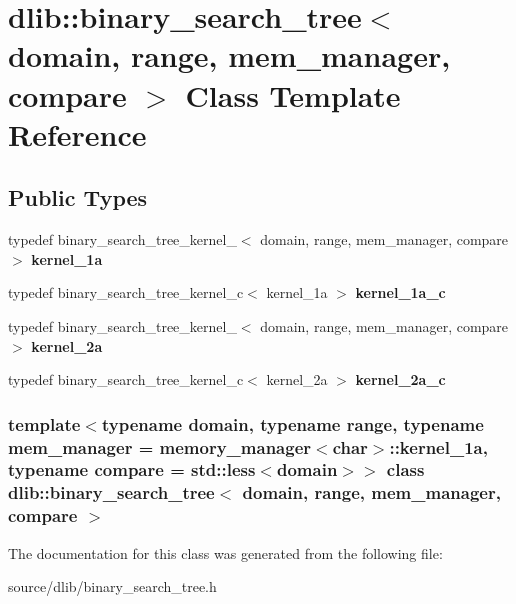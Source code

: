 \hypertarget{classdlib_1_1binary__search__tree}{
\section{dlib::binary\_\-search\_\-tree$<$ domain, range, mem\_\-manager, compare $>$ Class Template Reference}
\label{classdlib_1_1binary__search__tree}
}
\subsection*{Public Types}
\begin{DoxyCompactItemize}
\item 
\hypertarget{classdlib_1_1binary__search__tree_a8948f5148f1352f2615025fe1e4e3c16}{
typedef binary\_\-search\_\-tree\_\-kernel\_$<$ domain, range, mem\_\-manager, compare $>$ {\bfseries kernel\_\-1a}}
\label{classdlib_1_1binary__search__tree_a8948f5148f1352f2615025fe1e4e3c16}

\item 
\hypertarget{classdlib_1_1binary__search__tree_aa375ea38939f84497b3e94b9256b2909}{
typedef binary\_\-search\_\-tree\_\-kernel\_\-c$<$ kernel\_\-1a $>$ {\bfseries kernel\_\-1a\_\-c}}
\label{classdlib_1_1binary__search__tree_aa375ea38939f84497b3e94b9256b2909}

\item 
\hypertarget{classdlib_1_1binary__search__tree_abcc3cda8db16b8d85d89fa194f775831}{
typedef binary\_\-search\_\-tree\_\-kernel\_$<$ domain, range, mem\_\-manager, compare $>$ {\bfseries kernel\_\-2a}}
\label{classdlib_1_1binary__search__tree_abcc3cda8db16b8d85d89fa194f775831}

\item 
\hypertarget{classdlib_1_1binary__search__tree_a26a8ebb2b6bf26ccdf7b70757db44f92}{
typedef binary\_\-search\_\-tree\_\-kernel\_\-c$<$ kernel\_\-2a $>$ {\bfseries kernel\_\-2a\_\-c}}
\label{classdlib_1_1binary__search__tree_a26a8ebb2b6bf26ccdf7b70757db44f92}

\end{DoxyCompactItemize}
\subsubsection*{template$<$typename domain, typename range, typename mem\_\-manager = memory\_\-manager$<$char$>$::kernel\_\-1a, typename compare = std::less$<$domain$>$$>$ class dlib::binary\_\-search\_\-tree$<$ domain, range, mem\_\-manager, compare $>$}



The documentation for this class was generated from the following file:\begin{DoxyCompactItemize}
\item 
source/dlib/binary\_\-search\_\-tree.h\end{DoxyCompactItemize}
